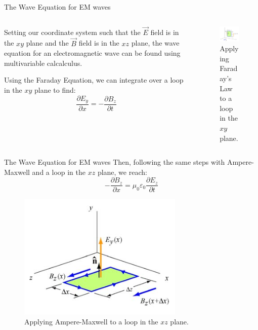 \documentclass{beamer}
\begin{document}
\begin{frame}{The Wave Equation for EM waves}
    \begin{columns}
    \begin{column}{.5\textwidth}
    Setting our coordinate system such that the $\vec{E}$ field is in the $xy$ plane and the $\vec{B}$ field is in the $xz$ plane, the wave equation for an electromagnetic wave can be found using multivariable calcalculus. \vspace{2mm}
    
    Using the Faraday Equation, we can integrate over a loop in the $xy$ plane to find:
    \[ \frac{\partial E_y}{\partial x} = -\frac{\partial B_z}{\partial t} \]
    \end{column}
    \begin{column}{.5\textwidth}
        \begin{figure}
            \centering
            \includegraphics[scale=.8]{efieldint.png}
            \caption{Applying Faraday's Law to a loop in the $xy$ plane.}
            \label{fig:my_label}
        \end{figure}
    \end{column}
    \end{columns}
\end{frame}

\begin{frame}{The Wave Equation for EM waves}
    Then, following the same steps with Ampere-Maxwell and a loop in the $xz$ plane, we reach:
    \[ - \frac{\partial B_z}{\partial x} = \mu_0\varepsilon_0\frac{\partial E_z}{\partial t}\]
    \begin{figure}
        \centering
        \includegraphics[scale=.9]{bfieldint.png}
        \caption{Applying Ampere-Maxwell to a loop in the $xz$ plane.}
        \label{fig:my_label}
    \end{figure}
\end{frame}
\end{document}
